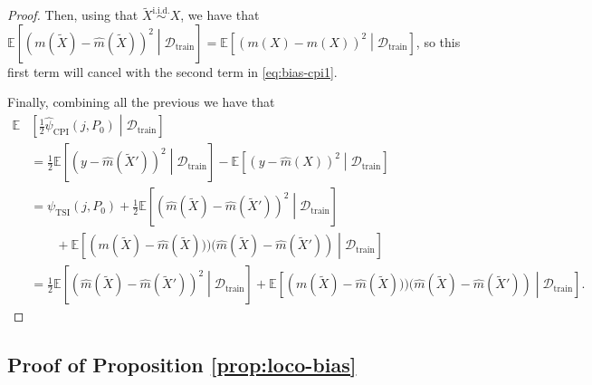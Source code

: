 \documentclass{article}
\theoremstyle{plain}
\theoremstyle{definition}
\theoremstyle{remark}
\newcommand{\e}[1]{\mathbb{E}\left[#1\right]  } %
\begin{document}
\begin{proof}
    
     Then, using that $\widetilde{X}\overset{\mathrm{i.i.d.}}{\sim}X$, we have that $\e{(m(\widetilde{X})-\widehat{m}(\widetilde{X}))^2\middle|\mathcal{D}_\mathrm{train}}=\e{(m(X)-\widehat{m}(X))^2\middle|\mathcal{D}_\mathrm{train}}$, so this first term will cancel with the second term in \eqref{eq:bias-cpi1}.
     
     Finally, combining all the previous we have that 
     \begin{align*}
         \mathbb{E}&\left[\frac{1}{2}\widehat{\psi}_\mathrm{CPI}(j, P_0)\middle|\mathcal{D}_\mathrm{train}\right]\\&=\frac{1}{2}\e{\left(y-\widehat{m}(\widetilde{X}')\right)^2\middle|\mathcal{D}_\mathrm{train}}-\e{\left(y-\widehat{m}(X)\right)^2\middle|\mathcal{D}_\mathrm{train}}\\&=\psi_\mathrm{TSI}(j, P_0)+\frac{1}{2}\e{\left(\widehat{m}(\widetilde{X})-\widehat{m}(\widetilde{X}')\right)^2\middle|\mathcal{D}_\mathrm{train}}\\&\qquad+ \e{\left(m(\widetilde{X})-\widehat{m}(\widetilde{X})))(\widehat{m}(\widetilde{X})-\widehat{m}(\widetilde{X}')\right)\middle|\mathcal{D}_\mathrm{train}}\\&=\frac{1}{2}\e{\left(\widehat{m}(\widetilde{X})-\widehat{m}(\widetilde{X}')\right)^2\middle|\mathcal{D}_\mathrm{train}}+ \e{\left(m(\widetilde{X})-\widehat{m}(\widetilde{X})))(\widehat{m}(\widetilde{X})-\widehat{m}(\widetilde{X}')\right)\middle|\mathcal{D}_\mathrm{train}}.
     \end{align*}
     
\end{proof}

\subsection{Proof of Proposition \ref{prop:loco-bias}}
\end{document}
